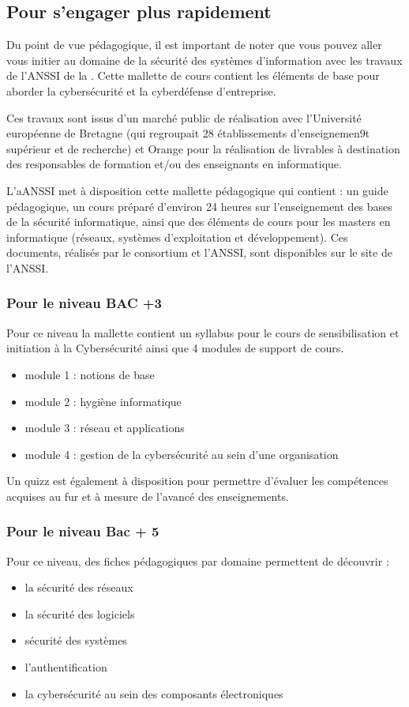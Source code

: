 \subsection{Pour s'engager plus rapidement}

Du point de vue pédagogique, il est important de noter que vous pouvez aller vous initier au domaine de la sécurité des systèmes d'information avec les travaux de l'ANSSI de la . Cette mallette de cours contient les éléments de base pour aborder la cybersécurité et la cyberdéfense d'entreprise.

Ces travaux sont issus d'un marché public de réalisation avec l’Université européenne de Bretagne  (qui regroupait 28 établissements d’enseignemen9t supérieur et de recherche) et Orange pour la réalisation de livrables à destination des responsables de formation et/ou des enseignants en informatique.

L’\gls{aANSSI} met à disposition cette mallette pédagogique qui contient : un guide pédagogique, un cours préparé d’environ 24 heures sur l’enseignement des bases de la sécurité informatique, ainsi que des éléments de cours pour les masters en informatique (réseaux, systèmes d’exploitation et développement).
Ces documents, réalisés par le consortium et l’ANSSI, sont disponibles sur le site de l'ANSSI.
 

\subsubsection {Pour le niveau BAC +3}

Pour ce niveau la mallette contient un syllabus pour le cours de sensibilisation et initiation à la Cybersécurité ainsi que 4 modules de support de cours.

\begin{itemize}
	\item module 1 :  notions de base
	\item module 2  :  hygiène informatique
	\item module 3 :  réseau et applications
	\item module 4 :  gestion de la cybersécurité au sein d’une organisation
\end{itemize}
Un quizz est également à disposition pour permettre d’évaluer les compétences acquises au fur et à mesure de l’avancé des enseignements.

\subsubsection{Pour le niveau Bac + 5} 

Pour ce niveau, des fiches pédagogiques par domaine permettent de découvrir :
\begin{itemize}
	\item la sécurité des réseaux
	\item la sécurité des logiciels
	\item sécurité des systèmes
	\item l’authentification
	\item la cybersécurité au sein des composants électroniques
\end{itemize}


